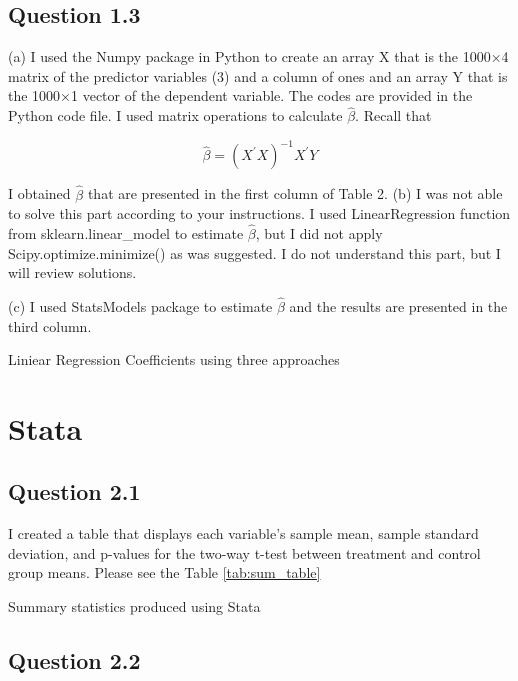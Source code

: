 \documentclass{article}
\begin{document}
\FloatBarrier
\subsection*{Question 1.3}
(a) I used the Numpy package in Python to create an array X that is the 1000×4 matrix of the predictor variables (3) and a column of ones and an array Y that is the 1000×1 vector
of the dependent variable. The codes are provided in the Python code file. I used matrix operations to calculate \(\hat{\beta}\). Recall that 

\[\hat{\beta} = (X^{'}X)^{-1}X^{'}Y \]

I obtained \(\hat{\beta}\) that are presented in the first column of Table 2. 
(b) I was not able to solve this part according to your instructions. I used LinearRegression function from sklearn.linear\_model to estimate  \(\hat{\beta}\), but I did not apply Scipy.optimize.minimize() as was suggested. I do not understand this part, but I will review solutions. 

(c) I used StatsModels package to estimate \(\hat{\beta}\) and the results are presented in the third column. 


\begin{table}[hbt!]
    \centering
    
    \caption{Liniear Regression Coefficients using three approaches}
     \label{tab:beta}
  \end{table}

  


\FloatBarrier
\section*{Stata}

\subsection*{Question 2.1}

I created a table that displays each variable’s sample mean, sample standard deviation, and p-values for the two-way t-test between treatment and control group means. Please see the Table \ref{tab:sum_table}


\begin{table}[hbt!]
    \centering
    
    \caption{Summary statistics produced using Stata}
    \label{tab:sum_table}
\end{table}

\subsection*{Question 2.2}
\end{document}

